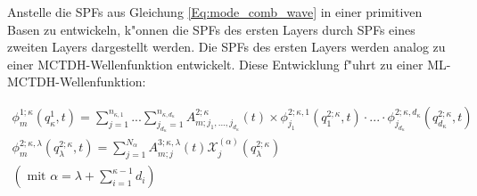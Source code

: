 Anstelle die SPFs aus Gleichung \ref{Eq:mode_comb_wave} in einer primitiven Basen zu entwickeln, k"onnen die SPFs des ersten Layers
durch SPFs eines zweiten Layers dargestellt werden. Die SPFs des ersten Layers werden analog zu einer MCTDH-Wellenfunktion entwickelt.
Diese Entwicklung f"uhrt zu einer ML-MCTDH-Wellenfunktion: 

\begin{equation}
  \begin{gathered}
 \phi^{1;\kappa}_{m} (q^1_{\kappa}, t)=\sum^{n_{\kappa,1}}_{j=1} ... \sum^{n_{\kappa,d_\kappa}}_{j_{d_\kappa}=1} A^{2;\kappa}_{m;j_1,...,j_{d_\kappa}}(t)
 \times \phi^{2;\kappa,1}_{j_1} (q^{2;\kappa}_{1}, t) \cdot ... \cdot
 \phi^{2;\kappa,d_\kappa}_{j_{d_\kappa}} (q^{2;\kappa}_{d_\kappa}, t)
\\
 \phi^{2;\kappa, \lambda}_{m} (q^{2;\kappa}_{\lambda}, t)= \sum^{N_{\alpha}}_{j=1} A^{3;\kappa, \lambda}_{m;j}(t)
 \mathcal{X}^{(\alpha)}_{j}(q^{2;\kappa}_\lambda)
\\
 \left( \text{ mit } \alpha = \lambda + \sum^{\kappa - 1}_{i=1}d_i \right)
 \label{Eq:ml_mctdh_mode_SPF}
\end{gathered}
 \end{equation}

